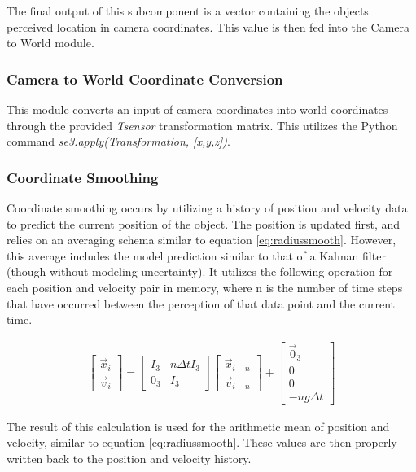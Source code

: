 \documentclass{article}
\begin{document}
The final output of this subcomponent is a vector containing the objects perceived location in camera coordinates. This value is then fed into the Camera to World module.

\subsubsection*{Camera to World Coordinate Conversion}
This module converts an input of camera coordinates into world coordinates through the provided \emph{Tsensor} transformation matrix. This utilizes the Python command \emph{se3.apply(Transformation, [x,y,z])}.

\subsubsection*{Coordinate Smoothing}
Coordinate smoothing occurs by utilizing a history of position and velocity data to predict the current position of the object. The position is updated first, and relies on an averaging schema similar to equation \ref{eq:radiussmooth}. However, this average includes the model prediction similar to that of a Kalman filter (though without modeling uncertainty). It utilizes the following operation for each position and velocity pair in memory, where n is the number of time steps that have occurred between the perception of that data point and the current time.

\begin{align} \label{eq:matrix_predict}
\begin{bmatrix}
    \vec{x}_{i} \\
    \vec{v}_{i}
\end{bmatrix}
=
\begin{bmatrix}
    I_{3} & n\Delta t I_{3} \\
    0_{3} & I_{3} 
\end{bmatrix}
\begin{bmatrix}
    \vec{x}_{i-n} \\
    \vec{v}_{i-n}
\end{bmatrix}
+
\begin{bmatrix}
    \vec{0}_{3} \\
    0 \\
    0 \\
    -ng\Delta t
\end{bmatrix}
\end{align}

The result of this calculation is used for the arithmetic mean of position and velocity, similar to equation \ref{eq:radiussmooth}. These values are then properly written back to the position and velocity history. 
\end{document}
